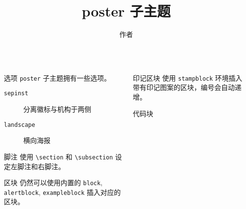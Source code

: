 \documentclass{ctexbeamer}
\begin{document}
  \title{poster 子主题}
  \author{作者}
  \logo{\zhlogo}
  \begin{frame}[fragile]
    \begin{columns}
      \begin{column}{0.45\textwidth}
        \begin{block}{选项}
          \texttt{poster} 子主题拥有一些选项。
          \begin{description}
            \item[\texttt{sepinst}] 分离徽标与机构于两侧
            \item[\texttt{landscape}] 横向海报 
          \end{description}
        \end{block}
        \begin{alertblock}{脚注}
          使用 \texttt{\textbackslash{}section} 和 \texttt{\textbackslash{}subsection} 设定左脚注和右脚注。
        \end{alertblock}
        \begin{exampleblock}{区块}
          仍然可以使用内置的 \texttt{block}, \texttt{alertblock}, \texttt{exampleblock} 插入对应的区块。
        \end{exampleblock}
      \end{column}
      \begin{column}{0.45\textwidth}
        
        \begin{stampblock}{印记区块}
          使用 \texttt{stampblock} 环境插入带有印记图案的区块，编号会自动递增。
        \end{stampblock}
        
        
        \begin{codeblock}[escapechar=|]{代码块}
        \end{codeblock}
        

      \end{column}
    \end{columns}
  \end{frame}
\end{document}
